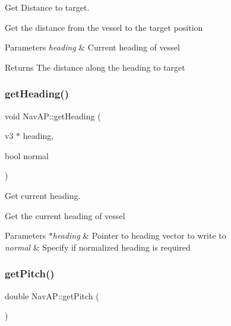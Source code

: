 Get Distance to target. 

Get the distance from the vessel to the target position 
\begin{DoxyParams}{Parameters}
{\em heading} & Current heading of vessel \\
\hline
\end{DoxyParams}
\begin{DoxyReturn}{Returns}
The distance along the heading to target 
\end{DoxyReturn}
\mbox{\label{classNavAP_ab9ef70ad4fe6f4eaed5e03e421bacdf2}} 
\subsubsection{\texorpdfstring{get\+Heading()}{getHeading()}}
{\footnotesize\ttfamily void Nav\+A\+P\+::get\+Heading (\begin{DoxyParamCaption}\item[{v3 $\ast$}]{heading,  }\item[{bool}]{normal }\end{DoxyParamCaption})\hspace{0.3cm}{\ttfamily [private]}}



Get current heading. 

Get the current heading of vessel 
\begin{DoxyParams}{Parameters}
{\em $\ast$heading} & Pointer to heading vector to write to \\
\hline
{\em normal} & Specify if normalized heading is required \\
\hline
\end{DoxyParams}
\mbox{\label{classNavAP_a7fc8e4aae8a9b3475651637773955b6f}} 
\subsubsection{\texorpdfstring{get\+Pitch()}{getPitch()}}
{\footnotesize\ttfamily double Nav\+A\+P\+::get\+Pitch (\begin{DoxyParamCaption}{ }\end{DoxyParamCaption})\hspace{0.3cm}{\ttfamily [private]}}



